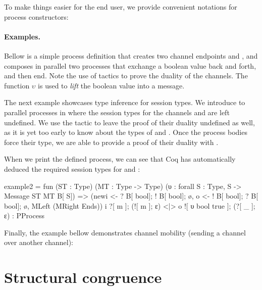 \documentclass{mproj}
\begin{document}

To make things easier for the end user, we provide convenient notations for process constructors:


\paragraph{Examples.} Bellow is a simple process definition that creates two channel endpoints  and , and composes in parallel two processes that exchange a boolean value back and forth, and then end. Note the use of tactics to prove the duality of the channels. The function $\upsilon$ is used to \emph{lift} the boolean value  into a message.


The next example showcases type inference for session types. We introduce to parallel processes in where the session types for the channels  and  are left undefined. We use the tactic  to leave the proof of their duality undefined as well, as it is yet too early to know about the types of  and . Once the process bodies force their type, we are able to provide a proof of their duality with .


When we print the defined process, we can see that Coq has automatically deduced the required session types for  and :

\begin{coq}
example2 = 
fun (ST : Type) (MT : Type -> Type) (υ : forall S : Type, S -> Message ST MT B[ S]) =>
(newi <- ? B[ bool]; ! B[ bool]; ø, o <- ! B[ bool]; ? B[ bool]; ø,
MLeft (MRight Ends)) i ?[ m ]; (![ m ]; ε) <|> o ![ υ bool true ]; (?[ _ ]; ε)
     : PProcess
\end{coq}

Finally, the example bellow demonstrates channel mobility (sending a channel over another channel):


\section{Structural congruence}\label{structural-congruence}
\end{document}
